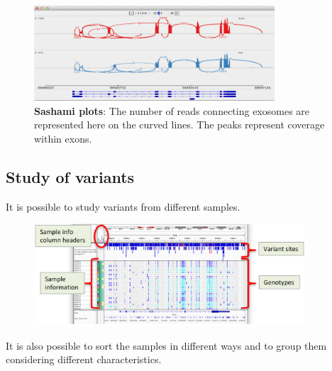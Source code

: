 \begin{figure}[H]
    \centering
    \includegraphics[width=0.8\textwidth]{sashamiplot.PNG}
    \caption{\textbf{Sashami plots}: The number of reads connecting exosomes are represented here on the curved lines. The peaks represent coverage within exons.}
    \label{fig:sashami}
\end{figure}

\subsection{Study of variants}
It is possible to study variants from different samples.
\begin{figure}[H]
    \centering
    \includegraphics[width=0.9\textwidth]{variantsView.PNG}
    \label{fig:variants}
\end{figure}

It is also possible to sort the samples in different ways and to group them
considering different characteristics.

